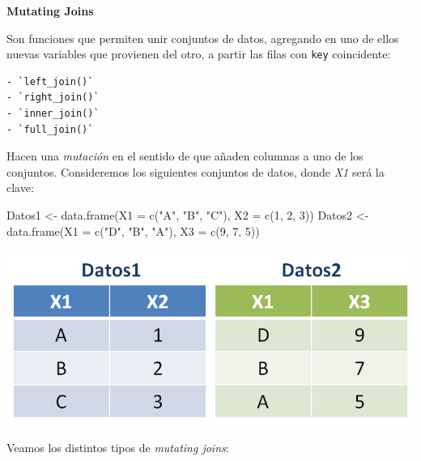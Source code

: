 \documentclass[
]{book}
\newenvironment{Shaded}{\begin{snugshade}}{\end{snugshade}}
\newcommand{\AttributeTok}[1]{\textcolor[rgb]{0.77,0.63,0.00}{#1}}
\newcommand{\DecValTok}[1]{\textcolor[rgb]{0.00,0.00,0.81}{#1}}
\newcommand{\FunctionTok}[1]{\textcolor[rgb]{0.00,0.00,0.00}{#1}}
\newcommand{\NormalTok}[1]{#1}
\newcommand{\OtherTok}[1]{\textcolor[rgb]{0.56,0.35,0.01}{#1}}
\newcommand{\StringTok}[1]{\textcolor[rgb]{0.31,0.60,0.02}{#1}}
\begin{document}
\textbf{Mutating Joins}

Son funciones que permiten unir conjuntos de datos, agregando en uno de ellos nuevas variables que provienen del otro, a partir las filas con \texttt{key} coincidente:

\begin{verbatim}
- `left_join()`
- `right_join()`
- `inner_join()`
- `full_join()`
\end{verbatim}

Hacen una \emph{mutación} en el sentido de que añaden columnas a uno de los conjuntos. Consideremos los siguientes conjuntos de datos, donde \emph{X1} será la clave:

\begin{Shaded}
\begin{Highlighting}[]
\NormalTok{Datos1 }\OtherTok{\textless{}{-}} \FunctionTok{data.frame}\NormalTok{(}\AttributeTok{X1 =} \FunctionTok{c}\NormalTok{(}\StringTok{"A"}\NormalTok{, }\StringTok{"B"}\NormalTok{, }\StringTok{"C"}\NormalTok{), }\AttributeTok{X2 =} \FunctionTok{c}\NormalTok{(}\DecValTok{1}\NormalTok{, }\DecValTok{2}\NormalTok{, }\DecValTok{3}\NormalTok{))}
\NormalTok{Datos2 }\OtherTok{\textless{}{-}} \FunctionTok{data.frame}\NormalTok{(}\AttributeTok{X1 =} \FunctionTok{c}\NormalTok{(}\StringTok{"D"}\NormalTok{, }\StringTok{"B"}\NormalTok{, }\StringTok{"A"}\NormalTok{), }\AttributeTok{X3 =} \FunctionTok{c}\NormalTok{(}\DecValTok{9}\NormalTok{, }\DecValTok{7}\NormalTok{, }\DecValTok{5}\NormalTok{))}
\end{Highlighting}
\end{Shaded}

\begin{center}\includegraphics[width=0.4\linewidth]{images/06_archivos/Tabla1} \end{center}

Veamos los distintos tipos de \emph{mutating joins}:
\end{document}
